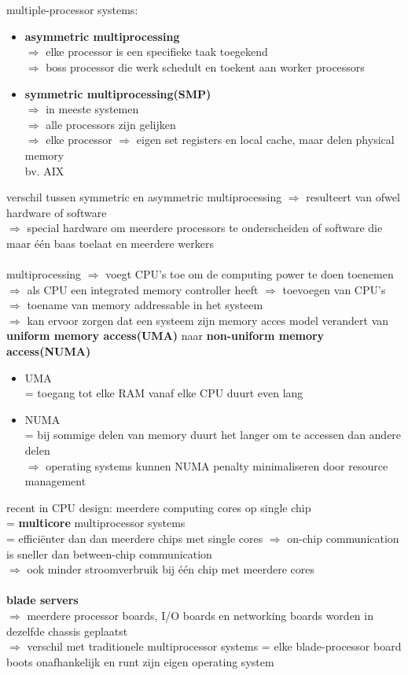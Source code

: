 \documentclass{report}
\begin{document}
\\
\\ multiple-processor systems:
\begin{itemize}
\item \textbf{asymmetric multiprocessing}
\\$\Rightarrow$ elke processor is een specifieke taak toegekend
\\$\Rightarrow$ boss processor die werk schedult en toekent aan worker processors
\item \textbf{symmetric multiprocessing(SMP)}
\\$\Rightarrow$ in meeste systemen
\\$\Rightarrow$ alle processors zijn gelijken
\\$\Rightarrow$ elke processor $\Rightarrow$ eigen set registers en local cache, maar delen physical memory
\\bv. AIX
\end{itemize}
verschil tussen symmetric en asymmetric multiprocessing $\Rightarrow$ resulteert van ofwel hardware of software
\\$\Rightarrow$ special hardware om meerdere processors te onderscheiden of software die maar \'e\'en baas toelaat en meerdere werkers
\\
\\multiprocessing $\Rightarrow$ voegt CPU's toe om de computing power te doen toenemen
\\$\Rightarrow$ als CPU een integrated memory controller heeft $\Rightarrow$ toevoegen van CPU's $\Rightarrow$ toename van memory addressable in het systeem 
\\$\Rightarrow$ kan ervoor zorgen dat een systeem zijn memory acces model verandert van \textbf{uniform memory access(UMA)} naar \textbf{non-uniform memory access(NUMA)}
\begin{itemize}
\item UMA
\\= toegang tot elke RAM vanaf elke CPU duurt even lang
\item NUMA
\\= bij sommige delen van memory duurt het langer om te accessen dan andere delen
\\$\Rightarrow$ operating systems kunnen NUMA penalty minimaliseren door resource management
\end{itemize}
recent in CPU design: meerdere computing cores op single chip
\\= \textbf{multicore} multiprocessor systems
\\= effici\"enter dan dan meerdere chips met single cores $\Rightarrow$ on-chip communication is sneller dan between-chip communication
\\$\Rightarrow$ ook minder stroomverbruik bij \'e\'en chip met meerdere cores
\\
\\\textbf{blade servers}
\\$\Rightarrow$ meerdere processor boards, I/O boards en networking boards worden in dezelfde chassis geplaatst
\\$\Rightarrow$ verschil met traditionele multiprocessor systems = elke blade-processor board boots onafhankelijk en runt zijn eigen operating system 
\end{document}
